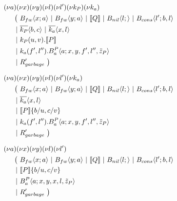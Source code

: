 \begin{align*}
  &\anew{a}{\anew{x}{\anew{y}{\anew{l}{\anew{l'}{\anew{k_P}{\anew{k_a}{ \\
    &\hspace{0.5cm}
    \begin{aligned}[t]
      \big(\ &\ains{B_{fw}}{x}{a}
      \apar   \ains{B_{fw}}{y}{a}
      \apar   \encMJtoAP{Q}
      \apar   \ains{B_{nil}}{l}{}
      \apar   \ains{B_{cons}}{l'}{b, l}
      \\
      \apar  &\asnd{k_P}{b,c}
      \apar   \asnd{k_a}{x,l}
      \\
      \apar  &\arcv{k_P}{u,v} . \encMJtoAP{P}
      \\
      \apar  &\arcv{k_a}{f',l''} . \ains{B_a^P}{a}{x, y, f', l'',\tilde{z}_P}
      \\
      \apar  &R_{garbage}'
      \ \big)
    \end{aligned}
  }}}}}}}
\end{align*}


\begin{align*}
  &\anew{a}{\anew{x}{\anew{y}{\anew{l}{\anew{l'}{\anew{k_a}{ \\
    &\hspace{0.5cm}
    \begin{aligned}[t]
      \big(\ &\ains{B_{fw}}{x}{a}
      \apar   \ains{B_{fw}}{y}{a}
      \apar   \encMJtoAP{Q}
      \apar   \ains{B_{nil}}{l}{}
      \apar   \ains{B_{cons}}{l'}{b, l}
      \\
      \apar  &\asnd{k_a}{x,l}
      \\
      \apar  &\encMJtoAP{P}\substitution{\subst{b}{u},\subst{c}{v}}
      \\
      \apar  &\arcv{k_a}{f',l''} . \ains{B_a^P}{a}{x, y, f', l'',\tilde{z}_P}
      \\
      \apar  &R_{garbage}'
      \ \big)
    \end{aligned}
  }}}}}}
\end{align*}


\begin{align*}
  &\anew{a}{\anew{x}{\anew{y}{\anew{l}{\anew{l'}{ \\
    &\hspace{0.5cm}
    \begin{aligned}[t]
      \big(\ &\ains{B_{fw}}{x}{a}
      \apar   \ains{B_{fw}}{y}{a}
      \apar   \encMJtoAP{Q}
      \apar   \ains{B_{nil}}{l}{}
      \apar   \ains{B_{cons}}{l'}{b, l}
      \\
      \apar  &\encMJtoAP{P}\substitution{\subst{b}{u},\subst{c}{v}}
      \\
      \apar  &\ains{B_a^P}{a}{x, y, x, l,\tilde{z}_P}
      \\
      \apar  &R_{garbage}'
      \ \big)
    \end{aligned}
  }}}}}
\end{align*}

